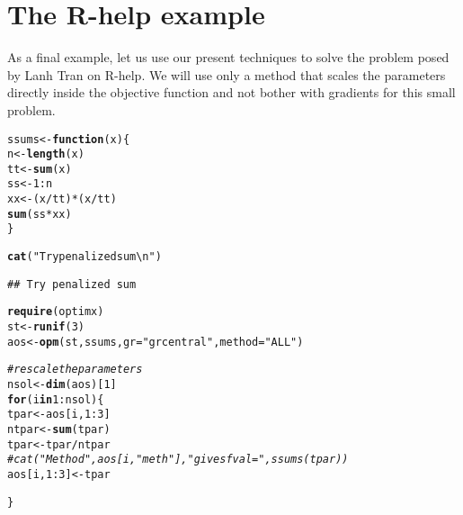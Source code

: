 \documentclass[11pt]{article}\usepackage[]{graphicx}\usepackage[]{color}
\makeatletter
\newcommand{\hlnum}[1]{\textcolor[rgb]{0.686,0.059,0.569}{#1}}%
\newcommand{\hlstr}[1]{\textcolor[rgb]{0.192,0.494,0.8}{#1}}%
\newcommand{\hlcom}[1]{\textcolor[rgb]{0.678,0.584,0.686}{\textit{#1}}}%
\newcommand{\hlopt}[1]{\textcolor[rgb]{0,0,0}{#1}}%
\newcommand{\hlstd}[1]{\textcolor[rgb]{0.345,0.345,0.345}{#1}}%
\newcommand{\hlkwa}[1]{\textcolor[rgb]{0.161,0.373,0.58}{\textbf{#1}}}%
\newcommand{\hlkwb}[1]{\textcolor[rgb]{0.69,0.353,0.396}{#1}}%
\newcommand{\hlkwc}[1]{\textcolor[rgb]{0.333,0.667,0.333}{#1}}%
\newcommand{\hlkwd}[1]{\textcolor[rgb]{0.737,0.353,0.396}{\textbf{#1}}}%
\newenvironment{kframe}{%
 \def\at@end@of@kframe{}%
 \ifinner\ifhmode%
  \def\at@end@of@kframe{\end{minipage}}%
  \begin{minipage}{\columnwidth}%
 \fi\fi%
 \def\FrameCommand##1{\hskip\@totalleftmargin \hskip-\fboxsep
 \colorbox{shadecolor}{##1}\hskip-\fboxsep
     \hskip-\linewidth \hskip-\@totalleftmargin \hskip\columnwidth}%
 \MakeFramed {\advance\hsize-\width
   \@totalleftmargin\z@ \linewidth\hsize
   \@setminipage}}%
 {\par\unskip\endMakeFramed%
 \at@end@of@kframe}
\newenvironment{knitrout}{}{} %
\makeatother
\begin{document}
\section{The R-help example}

As a final example, let us use our present techniques to solve the 
problem posed by Lanh Tran on R-help. We will use
only a method that scales the parameters directly inside the objective function and 
not bother with gradients for this small problem. 

\begin{knitrout}\scriptsize
{}\color{fgcolor}\begin{kframe}
\begin{alltt}
\hlstd{ssums}\hlkwb{<-}\hlkwa{function}\hlstd{(}\hlkwc{x}\hlstd{)\{}
  \hlstd{n}\hlkwb{<-}\hlkwd{length}\hlstd{(x)}
  \hlstd{tt}\hlkwb{<-}\hlkwd{sum}\hlstd{(x)}
  \hlstd{ss}\hlkwb{<-}\hlnum{1}\hlopt{:}\hlstd{n}
  \hlstd{xx}\hlkwb{<-}\hlstd{(x}\hlopt{/}\hlstd{tt)}\hlopt{*}\hlstd{(x}\hlopt{/}\hlstd{tt)}
  \hlkwd{sum}\hlstd{(ss}\hlopt{*}\hlstd{xx)}
\hlstd{\}}

\hlkwd{cat}\hlstd{(}\hlstr{"Try penalized sum\textbackslash{}n"}\hlstd{)}
\end{alltt}
\begin{verbatim}
## Try penalized sum
\end{verbatim}
\begin{alltt}
\hlkwd{require}\hlstd{(optimx)}
\hlstd{st}\hlkwb{<-}\hlkwd{runif}\hlstd{(}\hlnum{3}\hlstd{)}
\hlstd{aos}\hlkwb{<-}\hlkwd{opm}\hlstd{(st, ssums,} \hlkwc{gr}\hlstd{=}\hlstr{"grcentral"}\hlstd{,} \hlkwc{method}\hlstd{=}\hlstr{"ALL"}\hlstd{)}
\end{alltt}


{\ttfamily\noindent\color{warningcolor}{\#\# Warning in optimr(par, fn, gr, method = meth, lower = lower, upper = upper, : Successful convergence\ \ Restarts for stagnation =0}}\begin{alltt}
\hlcom{# rescale the parameters}
\hlstd{nsol}\hlkwb{<-}\hlkwd{dim}\hlstd{(aos)[}\hlnum{1}\hlstd{]}
\hlkwa{for} \hlstd{(i} \hlkwa{in} \hlnum{1}\hlopt{:}\hlstd{nsol)\{}
  \hlstd{tpar}\hlkwb{<-}\hlstd{aos[i,}\hlnum{1}\hlopt{:}\hlnum{3}\hlstd{]}
  \hlstd{ntpar}\hlkwb{<-}\hlkwd{sum}\hlstd{(tpar)}
  \hlstd{tpar}\hlkwb{<-}\hlstd{tpar}\hlopt{/}\hlstd{ntpar}
\hlcom{#  cat("Method ",aos[i, "meth"]," gives fval =", ssums(tpar))}
  \hlstd{aos[i,} \hlnum{1}\hlopt{:}\hlnum{3}\hlstd{]}\hlkwb{<-}\hlstd{tpar}

\hlstd{\}}


\end{alltt}
\end{kframe}
\end{knitrout}
\end{document}
